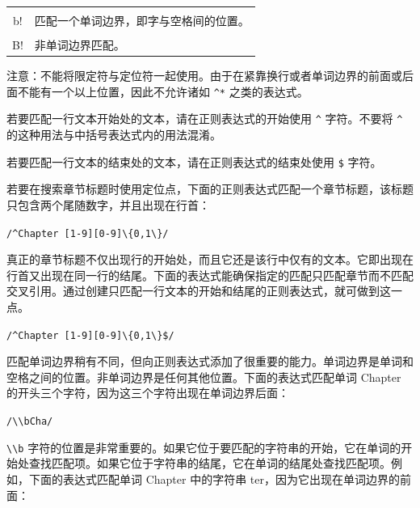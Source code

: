 \documentclass[doctor,openright,twoside]{sjtuthesis}
\newcommand{\passthrough}[1]{#1}
\theoremstyle{plain}
\theoremstyle{definition}
\theoremstyle{remark}
\theoremstyle{ocrenumbox}
\theoremstyle{plain}
\begin{document}
\begin{longtable}[]{@{}cl@{}}
\begin{minipage}[t]{0.23\columnwidth}\centering
\passthrough{\lstinline!\\b!}\strut
\end{minipage} & \begin{minipage}[t]{0.72\columnwidth}\raggedright
匹配一个单词边界，即字与空格间的位置。\strut
\end{minipage}\tabularnewline
\begin{minipage}[t]{0.23\columnwidth}\centering
\passthrough{\lstinline!\\B!}\strut
\end{minipage} & \begin{minipage}[t]{0.72\columnwidth}\raggedright
非单词边界匹配。\strut
\end{minipage}\tabularnewline
\bottomrule
\end{longtable}

注意：不能将限定符与定位符一起使用。由于在紧靠换行或者单词边界的前面或后面不能有一个以上位置，因此不允许诸如 \passthrough{\lstinline!^*!} 之类的表达式。

若要匹配一行文本开始处的文本，请在正则表达式的开始使用 \passthrough{\lstinline!^!} 字符。不要将 \passthrough{\lstinline!^!} 的这种用法与中括号表达式内的用法混淆。

若要匹配一行文本的结束处的文本，请在正则表达式的结束处使用 \passthrough{\lstinline!$!} 字符。

若要在搜索章节标题时使用定位点，下面的正则表达式匹配一个章节标题，该标题只包含两个尾随数字，并且出现在行首：

\passthrough{\lstinline!/^Chapter [1-9][0-9]\{0,1\}/!}

真正的章节标题不仅出现行的开始处，而且它还是该行中仅有的文本。它即出现在行首又出现在同一行的结尾。下面的表达式能确保指定的匹配只匹配章节而不匹配交叉引用。通过创建只匹配一行文本的开始和结尾的正则表达式，就可做到这一点。

\passthrough{\lstinline!/^Chapter [1-9][0-9]\{0,1\}$/!}

匹配单词边界稍有不同，但向正则表达式添加了很重要的能力。单词边界是单词和空格之间的位置。非单词边界是任何其他位置。下面的表达式匹配单词 Chapter 的开头三个字符，因为这三个字符出现在单词边界后面：

\passthrough{\lstinline!/\\bCha/!}

\passthrough{\lstinline!\\b!} 字符的位置是非常重要的。如果它位于要匹配的字符串的开始，它在单词的开始处查找匹配项。如果它位于字符串的结尾，它在单词的结尾处查找匹配项。例如，下面的表达式匹配单词 Chapter 中的字符串 ter，因为它出现在单词边界的前面：
\end{document}
